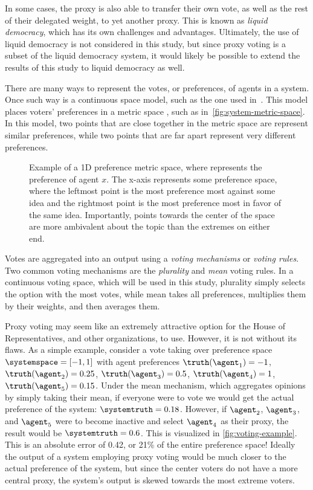 In some cases, the proxy is also able to transfer their own vote, as well as the rest of
their delegated weight, to yet another proxy.
This is known as \textit{liquid democracy}, which has its own challenges and advantages.
Ultimately, the use of liquid democracy is not considered in this study, but since proxy
voting is a subset of the liquid democracy system, it would likely be possible to
extend the results of this study to liquid democracy as well.

There are many ways to represent the votes, or preferences, of agents in a system.
Once such way is a continuous space model, such as the one used in~\cite{Cohensius2017}.
This model places voters' preferences in a metric space \systemspace, such as
in~\autoref{fig:system-metric-space}.
In this model, two points that are close together in the metric space are represent
similar preferences, while two points that are far apart represent very different
preferences.

\begin{figure}[htbp]
    \centering
    
    \caption{
        Example of a 1D preference metric space, where  represents the
        preference of agent $x$.
        The x-axis represents some preference space, where the leftmost point is
        the most preference most against some idea and the rightmost point is the most
        preference most in favor of the same idea.
        Importantly, points towards the center of the space are more ambivalent about
        the topic than the extremes on either end.
    }
    \label{fig:system-metric-space}
\end{figure}

Votes are aggregated into an output using a \textit{voting mechanisms} or
\textit{voting rules}.
Two common voting mechanisms are the \textit{plurality} and \textit{mean} voting rules.
In a continuous voting space, which will be used in this study, plurality simply
selects the option with the most votes, while mean takes all preferences, multiplies
them by their weights, and then averages them.

Proxy voting may seem like an extremely attractive option for the House of
Representatives, and other organizations, to use.
However, it is not without its flaws.
As a simple example, consider a vote taking over preference
space $\systemspace = [-1, 1]$ with agent preferences $\truthof{\agent_1} = -1$,
$\truthof{\agent_2} = 0.25$, $\truthof{\agent_3} = 0.5$, $\truthof{\agent_4} = 1$,
$\truthof{\agent_5} = 0.15$.
Under the mean mechanism, which aggregates opinions by simply taking their mean, if
everyone were to vote we would get the actual preference of the
system: $\systemtruth = 0.18$.
However, if $\agent_2$, $\agent_3$, and $\agent_5$ were to become inactive and select
$\agent_4$ as their proxy, the result would be $\systemtruth = 0.6$.
This is visualized in \autoref{fig:voting-example}.
This is an absolute error of 0.42, or 21\% of the entire preference space!
Ideally the output of a system employing proxy voting would be much closer to the
actual preference of the system, but since the center voters do not have a more
central proxy, the system's output is skewed towards the most extreme voters.

